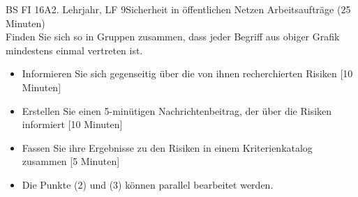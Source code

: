 \documentclass[oneside,openany,headings=optiontotoc,11pt,numbers=noenddot]{scrreprt}
\begin{document}
\begin{worksheet}{BS FI 16A}{2. Lehrjahr, LF 9}{Sicherheit in öffentlichen Netzen}
		\color{codegray}Arbeitsaufträge (25 Minuten)\\
		\color{black}
		Finden Sie sich so in Gruppen zusammen, dass jeder Begriff aus obiger Grafik mindestens einmal vertreten ist.
		\begin{itemize}
			\item[(1)] Informieren Sie sich gegenseitig über die von ihnen recherchierten Risiken [10 Minuten]\\
			\item[(2)] Erstellen Sie einen 5-minütigen Nachrichtenbeitrag, der über die Risiken informiert [10 Minuten]\\
			\item[(3)] Fassen Sie ihre Ergebnisse zu den Risiken in einem Kriterienkatalog zusammen [5 Minuten]\\
			\item[] \tiny Die Punkte (2) und (3) können parallel bearbeitet werden.
		\end{itemize}
	\end{worksheet}
\end{document}
